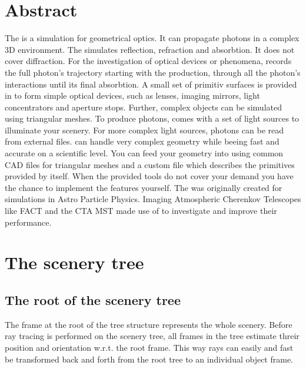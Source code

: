 \documentclass[11pt,a4paper,oneside,titlepage]{book}
\begin{document}
\chapter{Abstract}
%
The \tool{} is a simulation for geometrical optics. 
%
It can propagate photons in a complex 3D environment.
%
The \tool{} simulates reflection, refraction and absorbtion.
%
It does not cover diffraction.
%
For the investigation of optical devices or phenomena, \tool{} records the full photon's trajectory starting with the production, through all the photon's interactions until its final absorbtion.
%
A small set of primitiv surfaces is provided in \tool{} to form simple optical devices, such as lenses, imaging mirrors, light concentrators and aperture stops.
%
Further, complex objects can be simulated using triangular meshes.
%
To produce photons, \tool{} comes with a set of light sources to illuminate your scenery.
%
For more complex light sources, photons can be read from external files.
%
\tool{} can handle very complex geometry while beeing fast and accurate on a scientific level.
%
You can feed your geometry into \tool{} using common CAD files for triangular meshes and a custom \tool{} file which describes the primitives provided by \tool{} itself.
%
When the provided tools do not cover your demand you have the chance to implement the features yourself.   
%
The \tool{} was originally created for simulations in Astro Particle Physics.
%
Imaging Atmospheric Cherenkov Telescopes like FACT and the CTA MST made use of \tool{} to investigate and improve their performance.
%
\chapter{The scenery tree}
\blindtext[2]
\section{The root of the scenery tree}
\label{SubSecRootFrame}
The frame at the root of the tree structure represents the whole scenery.
%
Before ray tracing is performed on the scenery tree, all frames in the tree estimate threir position and orientation w.r.t. the root frame.
%
This way rays can easily and fast be transformed back and forth from the root tree to an individual object frame.
\end{document}
